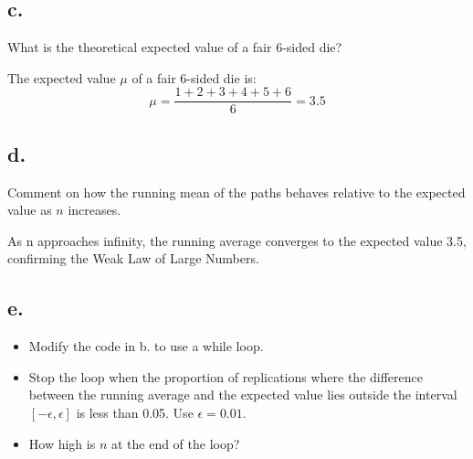 \documentclass[
]{article}
\begin{document}
\subsection{c.}\label{c.-2}

What is the theoretical expected value of a fair 6-sided die?

The expected value \(\mu\) of a fair 6-sided die is: \[
\mu = \frac{1 + 2 + 3 + 4 + 5 + 6}{6} = 3.5
\]

\subsection{d.~}\label{d.-1}

Comment on how the running mean of the paths behaves relative to the
expected value as \(n\) increases.

As n approaches infinity, the running average converges to the expected
value 3.5, confirming the Weak Law of Large Numbers.

\subsection{e.}\label{e.}

\begin{itemize}
\item
  Modify the code in b. to use a while loop.
\item
  Stop the loop when the proportion of replications where the difference
  between the running average and the expected value lies outside the
  interval \([-\epsilon,\epsilon]\) is less than 0.05. Use
  \(\epsilon = 0.01\).
\item
  How high is \(n\) at the end of the loop?
\end{itemize}
\end{document}
